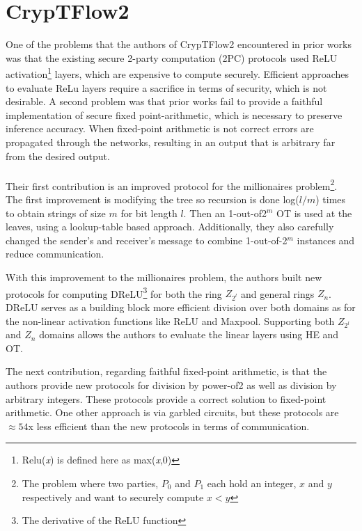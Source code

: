 \documentclass[../thesis.tex]{subfiles}
\begin{document}
\section{CrypTFlow2}
One of the problems that the authors of CrypTFlow2 encountered in prior works was that the existing secure 2-party computation (2PC) protocols used ReLU activation\footnote{Relu(\textit{x}) is defined here as max(\textit{x},0)} layers, which are expensive to compute securely. Efficient approaches to evaluate ReLu layers require a sacrifice in terms of security, which is not desirable. A second problem was that prior works fail to provide a faithful implementation of secure fixed point-arithmetic, which is necessary to preserve inference accuracy. When fixed-point arithmetic is not correct errors are propagated through the networks, resulting in an output that is arbitrary far from  the desired output. \paragraph{}

Their first contribution is an improved protocol for the millionaires problem\footnote{The problem where two parties, $P_0$ and $P_1$ each hold an integer, $x$ and $y$ respectively and want to securely compute $x<y$}. The first improvement is modifying the tree so recursion is done log($l/m$) times to obtain strings of size $m$ for bit length $l$. Then an 1-out-of2$^m$ OT is used at the leaves, using a lookup-table based approach. Additionally, they also carefully changed the sender's and receiver's message to combine 1-out-of-2$^m$ instances and reduce communication.  

With this improvement to the millionaires problem, the authors built new protocols for computing DReLU\footnote{The derivative of the ReLU function} for both the ring $Z_{2^l}$ and general rings $Z_n$. DReLU serves as a building block more efficient division over both domains as for the non-linear activation functions like ReLU and Maxpool. Supporting both $Z_{2^l}$ and $Z_n$ domains allows the authors to evaluate the linear layers using HE and OT. 

The next contribution, regarding faithful fixed-point arithmetic, is that the authors provide new protocols for division by power-of2 as well as division by arbitrary integers. These protocols provide a correct solution to fixed-point arithmetic. One other approach is via garbled circuits, but these protocols are $\approx 54$x less efficient than the new protocols in terms of communication. 
\end{document}

